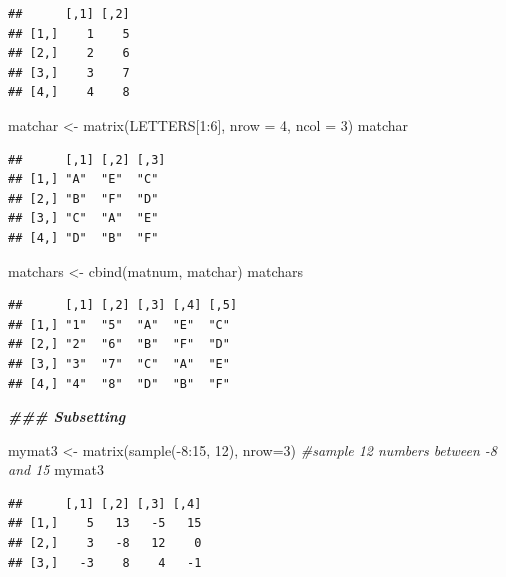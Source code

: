 \documentclass[
]{book}
\newenvironment{Shaded}{\begin{snugshade}}{\end{snugshade}}
\newcommand{\AttributeTok}[1]{\textcolor[rgb]{0.77,0.63,0.00}{#1}}
\newcommand{\CommentTok}[1]{\textcolor[rgb]{0.56,0.35,0.01}{\textit{#1}}}
\newcommand{\DecValTok}[1]{\textcolor[rgb]{0.00,0.00,0.81}{#1}}
\newcommand{\DocumentationTok}[1]{\textcolor[rgb]{0.56,0.35,0.01}{\textbf{\textit{#1}}}}
\newcommand{\FunctionTok}[1]{\textcolor[rgb]{0.00,0.00,0.00}{#1}}
\newcommand{\NormalTok}[1]{#1}
\newcommand{\OtherTok}[1]{\textcolor[rgb]{0.56,0.35,0.01}{#1}}
\newcommand{\SpecialCharTok}[1]{\textcolor[rgb]{0.00,0.00,0.00}{#1}}
\begin{document}
\begin{verbatim}
##      [,1] [,2]
## [1,]    1    5
## [2,]    2    6
## [3,]    3    7
## [4,]    4    8
\end{verbatim}

\begin{Shaded}
\begin{Highlighting}[]
\NormalTok{matchar }\OtherTok{\textless{}{-}} \FunctionTok{matrix}\NormalTok{(LETTERS[}\DecValTok{1}\SpecialCharTok{:}\DecValTok{6}\NormalTok{], }\AttributeTok{nrow =} \DecValTok{4}\NormalTok{, }\AttributeTok{ncol =} \DecValTok{3}\NormalTok{)}
\NormalTok{matchar}
\end{Highlighting}
\end{Shaded}

\begin{verbatim}
##      [,1] [,2] [,3]
## [1,] "A"  "E"  "C" 
## [2,] "B"  "F"  "D" 
## [3,] "C"  "A"  "E" 
## [4,] "D"  "B"  "F"
\end{verbatim}

\begin{Shaded}
\begin{Highlighting}[]
\NormalTok{matchars }\OtherTok{\textless{}{-}} \FunctionTok{cbind}\NormalTok{(matnum, matchar)}
\NormalTok{matchars}
\end{Highlighting}
\end{Shaded}

\begin{verbatim}
##      [,1] [,2] [,3] [,4] [,5]
## [1,] "1"  "5"  "A"  "E"  "C" 
## [2,] "2"  "6"  "B"  "F"  "D" 
## [3,] "3"  "7"  "C"  "A"  "E" 
## [4,] "4"  "8"  "D"  "B"  "F"
\end{verbatim}

\begin{Shaded}
\begin{Highlighting}[]
\DocumentationTok{\#\#\# Subsetting  }

\NormalTok{mymat3 }\OtherTok{\textless{}{-}} \FunctionTok{matrix}\NormalTok{(}\FunctionTok{sample}\NormalTok{(}\SpecialCharTok{{-}}\DecValTok{8}\SpecialCharTok{:}\DecValTok{15}\NormalTok{, }\DecValTok{12}\NormalTok{), }\AttributeTok{nrow=}\DecValTok{3}\NormalTok{)  }\CommentTok{\#sample 12 numbers between {-}8 and 15}
\NormalTok{mymat3}
\end{Highlighting}
\end{Shaded}

\begin{verbatim}
##      [,1] [,2] [,3] [,4]
## [1,]    5   13   -5   15
## [2,]    3   -8   12    0
## [3,]   -3    8    4   -1
\end{verbatim}
\end{document}
